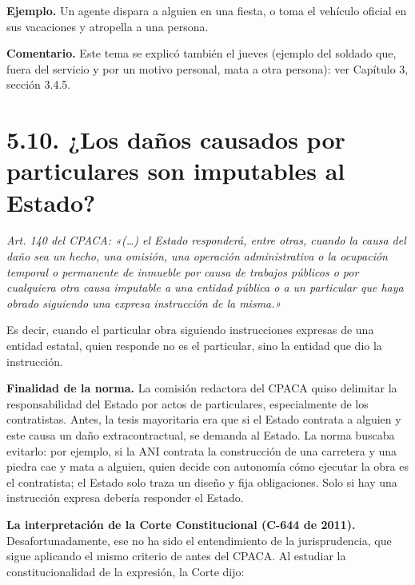 \begin{ejemplo}
\textcolor[HTML]{4F6228}{\textbf{Ejemplo. }}Un agente dispara a alguien en una fiesta, o toma el vehículo oficial en sus vacaciones y atropella a una persona.
\end{ejemplo}
\begin{comentario}
\textcolor[HTML]{8A6D3B}{\textbf{Comentario. }}Este tema se explicó también el jueves (ejemplo del soldado que, fuera del servicio y por un motivo personal, mata a otra persona): ver Capítulo 3, sección 3.4.5.
\end{comentario}
\section{5.10. ¿Los daños causados por particulares son imputables al Estado?}
\begin{cita}
\textit{Art. 140 del CPACA: «(…) el Estado responderá, entre otras, cuando la causa del daño sea un hecho, una omisión, una operación administrativa o la ocupación temporal o permanente de inmueble por causa de trabajos públicos o por cualquiera otra causa imputable a una entidad pública o a un particular que haya obrado siguiendo una expresa instrucción de la misma.»}
\end{cita}
Es decir, cuando el particular obra siguiendo instrucciones expresas de una entidad estatal, quien responde no es el particular, sino la entidad que dio la instrucción.

\textbf{Finalidad de la norma.} La comisión redactora del CPACA quiso delimitar la responsabilidad del Estado por actos de particulares, especialmente de los contratistas. Antes, la tesis mayoritaria era que si el Estado contrata a alguien y este causa un daño extracontractual, se demanda al Estado. La norma buscaba evitarlo: por ejemplo, si la ANI contrata la construcción de una carretera y una piedra cae y mata a alguien, quien decide con autonomía cómo ejecutar la obra es el contratista; el Estado solo traza un diseño y fija obligaciones. Solo si hay una instrucción expresa debería responder el Estado.

\textbf{La interpretación de la Corte Constitucional (C-644 de 2011).} Desafortunadamente, ese no ha sido el entendimiento de la jurisprudencia, que sigue aplicando el mismo criterio de antes del CPACA. Al estudiar la constitucionalidad de la expresión, la Corte dijo:

